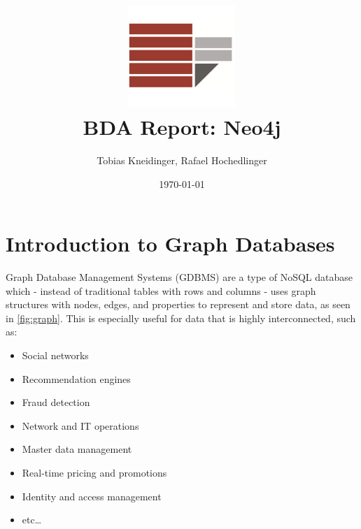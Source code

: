 \documentclass[english,smartquotes,apa]{hgbreport}
\begin{document}

\author{Tobias Kneidinger, Rafael Hochedlinger}                      %
\title{
	\includegraphics[width=0.3\textwidth]{images/logo-unical.png} \\[1em]
	BDA Report: Neo4j
} %
\date{\today}

\maketitle

\tableofcontents

\newpage


\section*{Introduction to Graph Databases}

Graph Database Management Systems (GDBMS) are a type of NoSQL database which - instead of traditional tables with rows and columns - uses graph structures with nodes, edges, and properties to represent and store data, as seen in \autoref{fig:graph}. This is especially useful for data that is highly interconnected, such as:

\begin{itemize}
	\item Social networks
	\item Recommendation engines
	\item Fraud detection
	\item Network and IT operations
	\item Master data management
	\item Real-time pricing and promotions
	\item Identity and access management
	\item etc\dots
\end{itemize}
\end{document}
